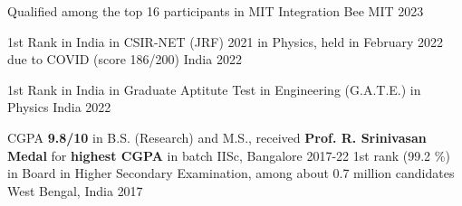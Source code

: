 




\begin{cvhonors}

 \cvhonor
{} %
{Qualified among the top 16 participants in MIT Integration Bee} %
{MIT} %
{2023} %

 \cvhonor
{1st Rank in India} %
{in CSIR-NET (JRF) 2021 in Physics, held in February 2022 due to COVID (score 186/200)} %
{India} %
{2022} %

 \cvhonor
{1st Rank in India} %
{in Graduate Aptitute Test in Engineering (G.A.T.E.) in Physics} %
{India} %
{2022} %

  \cvhonor
{} %
{CGPA \textbf{\color[HTML]{414141} 9.8/10} in B.S. (Research) and M.S., received \textbf{\color[HTML]{414141} Prof. R. Srinivasan Medal} for \textbf{\color[HTML]{414141} highest CGPA} in batch} %
{IISc, Bangalore} %
{2017-22} %
  \cvhonor
    {1st rank (99.2 \%) in Board} %
    {in Higher Secondary Examination, among about 0.7 million candidates} %
    {West Bengal, India} %
    {2017} %


	 


\end{cvhonors}
